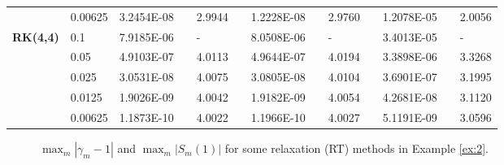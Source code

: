 \documentclass[preprint,compress,3p,10pt,fleqn]{elsarticle}
\numberwithin{equation}{section}
\begin{document}
\begin{table}[H]
\begin{tabular}{lllllrlrlrlrlrl}
\multicolumn{2}{l}{} & \multicolumn{2}{l}{0.00625} & 3.2454E-08 &       & 2.9944  &       & 1.2228E-08 &       & 2.9760  &       & 1.2078E-05 &       & 2.0056  \\
\multicolumn{2}{l}{\multirow{5}[1]{*}{\textbf{RK(4,4)}}} & \multicolumn{2}{l}{0.1} & 7.9185E-06 &       & -     &       & 8.0508E-06 &       & -     &       & 3.4013E-05 &       & - \\
\multicolumn{2}{l}{} & \multicolumn{2}{l}{0.05} & 4.9103E-07 &       & 4.0113  &       & 4.9644E-07 &       & 4.0194  &       & 3.3898E-06 &       & 3.3268  \\
\multicolumn{2}{l}{} & \multicolumn{2}{l}{0.025} & 3.0531E-08 &       & 4.0075  &       & 3.0805E-08 &       & 4.0104  &       & 3.6901E-07 &       & 3.1995  \\
\multicolumn{2}{l}{} & \multicolumn{2}{l}{0.0125} & 1.9026E-09 &       & 4.0042  &       & 1.9182E-09 &       & 4.0054  &       & 4.2681E-08 &       & 3.1120  \\
\multicolumn{2}{l}{} & \multicolumn{2}{l}{0.00625} & 1.1873E-10 &       & 4.0022  &       & 1.1966E-10 &       & 4.0027  &       & 5.1191E-09 &       & 3.0596  \\
\bottomrule
\end{tabular}%
\label{tab:6-2}%
\end{table}%
	
\begin{figure}[H]
\begin{center}
\caption{$\max _m\left|\gamma_m-1\right|$ and $\max_m\left|S_m(1)\right|$ for some relaxation (RT) methods in Example \ref{ex:2}.}
\label{fig:2-1}
\end{center}
\end{figure}
	
\end{document}
